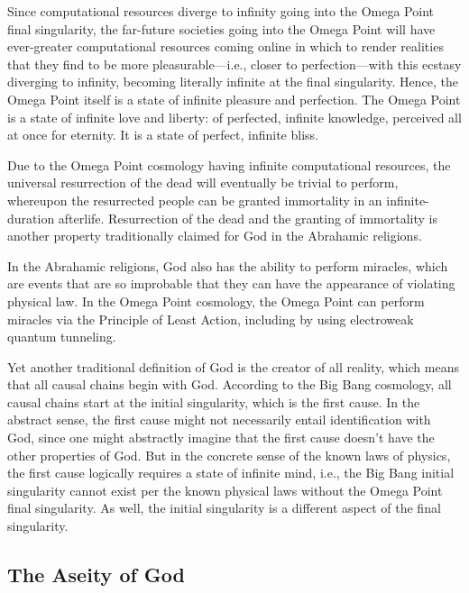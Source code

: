 \documentclass[letterpaper,12pt]{article}
\begin{document}
Since computational resources diverge to infinity going into the Omega Point final singularity, the far-future societies going into the Omega Point will have ever-greater computational resources coming online in which to render realities that they find to be more pleasurable---i.e., closer to perfection---with this ecstasy diverging to infinity, becoming literally infinite at the final singularity. Hence, the Omega Point itself is a state of infinite pleasure and perfection. The Omega Point is a state of infinite love and liberty: of perfected, infinite knowledge, perceived all at once for eternity. It is a state of perfect, infinite bliss.

Due to the Omega Point cosmology having infinite computational resources, the universal resurrection of the dead will eventually be trivial to perform, whereupon the resurrected people can be granted immortality in an infinite-duration afterlife. Resurrection of the dead and the granting of immortality is another property traditionally claimed for God in the Abrahamic religions.

In the Abrahamic religions, God also has the ability to perform \glspl{miracle}, which are events that are so improbable that they can have the appearance of violating physical law. In the Omega Point cosmology, the Omega Point can perform miracles via the Principle of Least Action, including by using electroweak quantum tunneling.

Yet another traditional definition of God is the creator of all reality, which means that all causal chains begin with God. According to the Big Bang cosmology, all causal chains start at the initial singularity, which is the first cause. In the abstract sense, the first cause might not necessarily entail identification with God, since one might abstractly imagine that the first cause doesn't have the other properties of God. But in the concrete sense of the known laws of physics, the first cause logically requires a state of infinite mind, i.e., the Big Bang initial singularity cannot exist per the known physical laws without the Omega Point final singularity. As well, the initial singularity is a different aspect of the final singularity.

\subsection{The Aseity of God}
\label{subsec:AseityOfGod}
\end{document}
